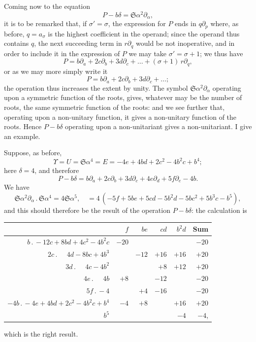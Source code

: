 \documentclass[11pt,a4paper]{book}
\begin{document}
{{{\setcounter{art}{24}
\begin{art}
Coming now to the equation
\[
P - b\delta = \mathfrak{S}\alpha^{2}\partial_{\alpha},
\]
it is to be remarked that, if $\sigma' = \sigma$, the expression for $P$ ends in $q\partial_{p}$ where, as before, $q = a_{\sigma}$ is the highest coefficient in the operand; since the operand thus contains $q$, the next succeeding term in $r\partial_{q}$ would be not inoperative, and in order to include it in the expression of $P$ we may take $\sigma' = \sigma + 1$; we thus have
\[
P = b\partial_{a} + 2c\partial_{b} + 3d\partial_{c} + \ldots + (\sigma + 1)\,r\partial_{q},
\]
or as we may more simply write it
\[
P = b\partial_{a} + 2c\partial_{b} + 3d\partial_{c} + \ldots;
\]
the operation thus increases the extent by unity. The symbol $\mathfrak{S}\alpha^{2}\partial_{\alpha}$ operating upon a symmetric function of the roots, gives, whatever may be the number of roots, the same symmetric function of the roots: and we see further that, operating upon a non-unitary function, it gives a non-unitary function of the roots. Hence $P - b\delta$ operating upon a non-unitariant gives a non-unitariant. I give an example.
\end{art}

\setcounter{art}{25}
\begin{art}
Suppose, as before,
\[
\Upsilon = U = \mathfrak{S}\alpha^{4} = E = -4e + 4bd + 2c^{2} - 4b^{2}c + b^{4};
\]
here $\delta = 4$, and therefore
\[
P - b\delta = b\partial_{a} + 2c\partial_{b} + 3d\partial_{c} + 4e\partial_{d} + 5f\partial_{e} - 4b.
\]
We have
\[
\mathfrak{S}\alpha^{2}\partial_{\alpha}\,.\,\mathfrak{S}\alpha^{4} = 4\mathfrak{S}\alpha^{5},\quad = 4\,(-5f + 5be + 5cd - 5b^{2}d - 5bc^{2} + 5b^{3}c - b^{5}),
\]
and this should therefore be the result of the operation $P - b\delta$: the calculation is
\begin{center}
\begin{tabular}{r|rrrr|r}
 & $f$ & $be$ & $cd$ & $b^{2}d$ & Sum \\
\hline
$b\,.\,-12c + 8bd + 4c^{2} - 4b^{2}c$ & $-20$ & & & & $-20$ \\
$2c\,.\,\phantom{+}4d - 8bc + 4b^{3}$ & & $-12$ & $+16$ & $+16$ & $+20$ \\
$3d\,.\,\phantom{+}4c - 4b^{2}$ & & & $+8$ & $+12$ & $+20$ \\
$4e\,.\,\phantom{+}4b$ & $+8$ & & $-12$ & & $-20$ \\
$5f\,.\,-4$ & & $+4$ & $-16$ & & $-20$ \\
$-4b\,.\,-4e + 4bd + 2c^{2} - 4b^{2}c + b^{4}$ & $-4$ & $+8$ & & $+16$ & $+20$ \\
$b^{5}$ & & & & $-4$ & $-4$,
\end{tabular}
\end{center}
which is the right result.


\end{art}}}}
\end{document}
